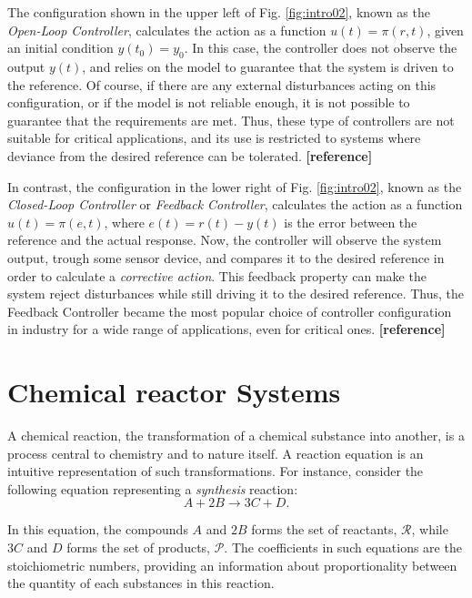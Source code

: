 \documentclass[a4paper,11pt]{book}
\numberwithin{figure}{chapter}
\numberwithin{equation}{chapter}
\numberwithin{table}{chapter}
\theoremstyle{definition}
\begin{document}
The configuration shown in the upper left of Fig. \ref{fig:intro02}, known as the \textit{Open-Loop Controller}, calculates the action as a function $u(t) = \pi(r, t)$, given an initial condition $y(t_0) = y_0$. In this case, the controller does not observe the output $y(t)$, and relies on the model to guarantee that the system is driven to the reference. Of course, if there are any external disturbances acting on this configuration, or if the model is not reliable enough, it is not possible to guarantee that the requirements are met. Thus, these type of controllers are not suitable for critical applications, and its use is restricted to systems where deviance from the desired reference can be tolerated. \textbf{[reference]}

In contrast, the configuration in the lower right of Fig. \ref{fig:intro02}, known as the \textit{Closed-Loop Controller} or \textit{Feedback Controller}, calculates the action as a function $u(t) = \pi(e, t)$, where $e(t) = r(t) - y(t)$ is the error between the reference and the actual response. Now, the controller will observe the system output, trough some sensor device, and compares it to the desired reference in order to calculate a \textit{corrective action}. This feedback property can make the system reject disturbances while still driving it to the desired reference. Thus, the Feedback Controller became the most popular choice of controller configuration in industry for a wide range of applications, even for critical ones.  \textbf{[reference]}

\section{Chemical reactor Systems}

A chemical reaction, the transformation of a chemical substance into another, is a process central to chemistry and to nature itself. A reaction equation is an intuitive representation of such transformations. For instance, consider the following equation representing a \textit{synthesis} reaction:
\begin{equation}
    A + 2 B \longrightarrow 3 C + D 
.\end{equation} 

\noindent In this equation, the compounds $A$ and $2 B$ forms the set of reactants, $\mathcal{R}$, while $3 C$ and $D$ forms the set of products, $\mathcal{P}$. The coefficients in such equations are the stoichiometric numbers, providing an information about proportionality between the quantity of each substances in this reaction. 
\end{document}
